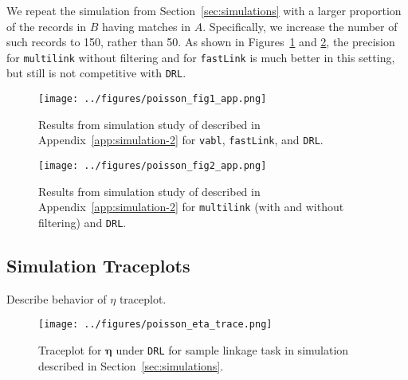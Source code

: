 \documentclass[12pt,letterpaper]{article}
\newcommand{\1}[1]{\mathbb{I}\!\left[#1\right]} %
\begin{document}
We repeat the simulation from Section~\ref{sec:simulations} with a larger proportion of the records in $B$ having matches in $A$. Specifically, we increase the number of such records to 150, rather than 50. As shown in Figures~\ref{fig:sim-vabl-comparison-2} and \ref{fig:sim-multilink-comparison-2}, the precision for \texttt{multilink} without filtering and for \texttt{fastLink} is much better in this setting, but still is not competitive with \texttt{DRL}. 

\begin{figure}[t]
	\centering
	\texttt{[image: ../figures/poisson\_fig1\_app.png]}
	\caption{Results from simulation study of described in Appendix~\ref{app:simulation-2} for \texttt{vabl}, \texttt{fastLink}, and \texttt{DRL}.}
	\label{fig:sim-vabl-comparison-2}
\end{figure}

\begin{figure}
	\centering
	\texttt{[image: ../figures/poisson\_fig2\_app.png]}
	\caption{Results from simulation study of described in Appendix~\ref{app:simulation-2} for \texttt{multilink} (with and without filtering) and \texttt{DRL}.}
	\label{fig:sim-multilink-comparison-2}
\end{figure}

\subsection{Simulation Traceplots}\label{app:simulation-traceplots}


Describe behavior of $\eta$ traceplot.
\begin{figure}[t]
	\centering
	\texttt{[image: ../figures/poisson\_eta\_trace.png]}
	\caption{Traceplot for $\bm{\eta}$ under \texttt{DRL} for sample linkage task in simulation described in Section~\ref{sec:simulations}.}
	\label{fig:eta-traceplot}
\end{figure}
\end{document}
